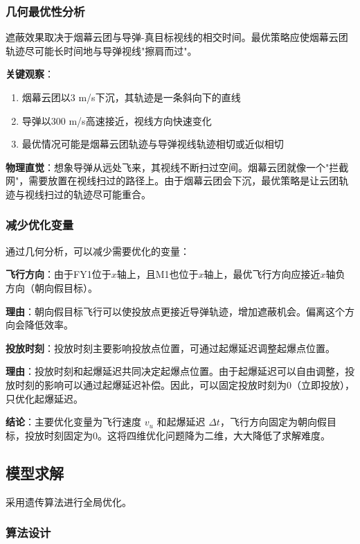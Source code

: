 \documentclass[12pt,a4paper]{article}
\begin{document}
\subsubsection{几何最优性分析}

遮蔽效果取决于烟幕云团与导弹-真目标视线的相交时间。最优策略应使烟幕云团轨迹尽可能长时间地与导弹视线"擦肩而过"。

\textbf{关键观察}：
\begin{enumerate}
    \item 烟幕云团以3 m/s下沉，其轨迹是一条斜向下的直线
    \item 导弹以300 m/s高速接近，视线方向快速变化
    \item 最优情况可能是烟幕云团轨迹与导弹视线轨迹相切或近似相切
\end{enumerate}

\textbf{物理直觉}：想象导弹从远处飞来，其视线不断扫过空间。烟幕云团就像一个"拦截网"，需要放置在视线扫过的路径上。由于烟幕云团会下沉，最优策略是让云团轨迹与视线扫过的轨迹尽可能重合。

\subsubsection{减少优化变量}

通过几何分析，可以减少需要优化的变量：

\textbf{飞行方向}：由于FY1位于$x$轴上，且M1也位于$x$轴上，最优飞行方向应接近$x$轴负方向（朝向假目标）。

\textbf{理由}：朝向假目标飞行可以使投放点更接近导弹轨迹，增加遮蔽机会。偏离这个方向会降低效率。

\textbf{投放时刻}：投放时刻主要影响投放点位置，可通过起爆延迟调整起爆点位置。

\textbf{理由}：投放时刻和起爆延迟共同决定起爆点位置。由于起爆延迟可以自由调整，投放时刻的影响可以通过起爆延迟补偿。因此，可以固定投放时刻为0（立即投放），只优化起爆延迟。

\textbf{结论}：主要优化变量为飞行速度 $v_u$ 和起爆延迟 $\Delta t$，飞行方向固定为朝向假目标，投放时刻固定为0。这将四维优化问题降为二维，大大降低了求解难度。

\subsection{模型求解}

采用遗传算法进行全局优化。

\subsubsection{算法设计}
\end{document}
